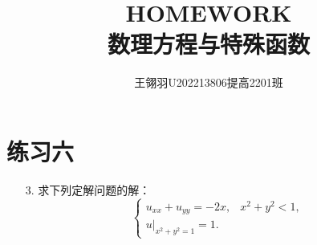 \documentclass[11pt]{article}
\begin{document}
\title{\vspace{-2cm}HOMEWORK\\ 数理方程与特殊函数}
\author{王翎羽\quad U202213806\quad 提高2201班}
\maketitle

\section*{练习六}
\begin{enumerate}
    \item[3.] 求下列定解问题的解：
     \begin{equation*}
        \left\{
         \begin{array}{lr}
         u_{xx}+u_{yy}=-2x,& x^2+y^2<1,\\u|_{x^2+y^2=1}=1.
         \end{array}
        \right.
     \end{equation*}


\end{enumerate}
\end{document}
